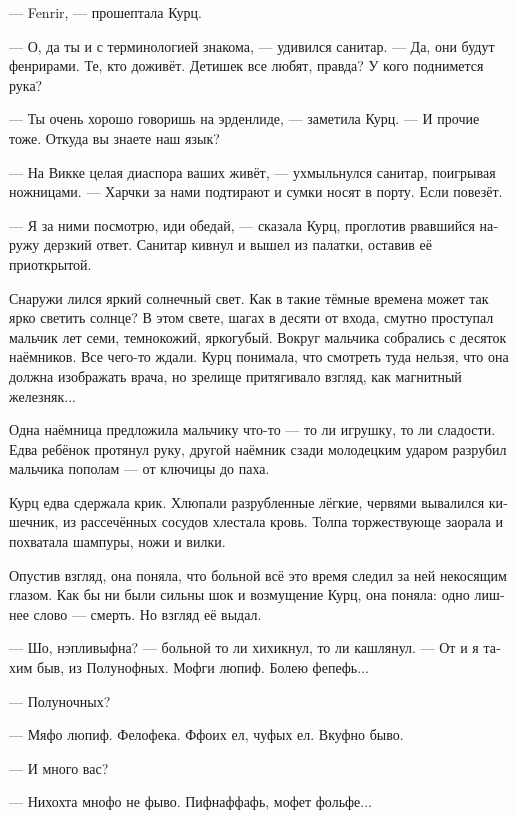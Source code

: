 \documentclass[a4paper,12pt,fleqn]{book}\usepackage{polyglossia}\setdefaultlanguage[babelshorthands=true]{russian}\setotherlanguage{english}\defaultfontfeatures{Ligatures=TeX,Mapping=tex-text}\usepackage{xcolor}\newcommand{\ml}[3]{#2}
\begin{document}
--- Fenrir, --- прошептала Курц.

--- О, да ты и с терминологией знакома, --- удивился санитар.
--- Да, они будут фенрирами.
Те, кто доживёт.
Детишек все любят, правда?
У кого поднимется рука?

--- Ты очень хорошо говоришь на эрденлиде, --- заметила Курц.
--- И прочие тоже.
Откуда вы знаете наш язык?

--- На Викке целая диаспора ваших живёт, --- ухмыльнулся санитар, поигрывая ножницами.
--- Харчки за нами подтирают и сумки носят в порту.
Если повезёт.

--- Я за ними посмотрю, иди обедай, --- сказала Курц, проглотив рвавшийся наружу дерзкий ответ.
Санитар кивнул и вышел из палатки, оставив её приоткрытой.

Снаружи лился яркий солнечный свет.
Как в такие тёмные времена может так ярко светить солнце?
В этом свете, шагах в десяти от входа, смутно проступал мальчик лет семи, темнокожий, яркогубый.
Вокруг мальчика собрались с десяток наёмников.
Все чего-то ждали.
Курц понимала, что смотреть туда нельзя, что она должна изображать врача, но зрелище притягивало взгляд, как магнитный железняк...

Одна наёмница предложила мальчику что-то --- то ли игрушку, то ли сладости.
Едва ребёнок протянул руку, другой наёмник сзади молодецким ударом разрубил мальчика пополам --- от ключицы до паха.

Курц едва сдержала крик.
Хлюпали разрубленные лёгкие, червями вывалился кишечник, из рассечённых сосудов хлестала кровь.
Толпа торжествующе заорала и похватала шампуры, ножи и вилки.

Опустив взгляд, она поняла, что больной всё это время следил за ней некосящим глазом.
Как бы ни были сильны шок и возмущение Курц, она поняла: одно лишнее слово --- смерть.
Но взгляд её выдал.

--- Шо, нэпливыфна? --- больной то ли хихикнул, то ли кашлянул.
--- От и я тахим быв, из Полунофных.
Мофги люпиф.
Болею фепефь...

\ml{$0$}
{--- Полуночных?}
{``Midnight Folk?''}

\ml{$0$}
{--- Мяфо люпиф.}
{``I life meaf.}
\ml{$0$}
{Фелофека.}
{Humaf meaf.}
Ффоих ел, чуфых ел.
\ml{$0$}
{Вкуфно быво.}
{Fafty.''}

\ml{$0$}
{--- И много вас?}
{``How many are you?''}

\ml{$0$}
{--- Нихохта мнофо не фыво.}
{``Nefef faf many.}
\ml{$0$}
{Пифнаффафь, мофет фольфе...}
{Fiffeen, mayfi mofe ...''}
\end{document}
